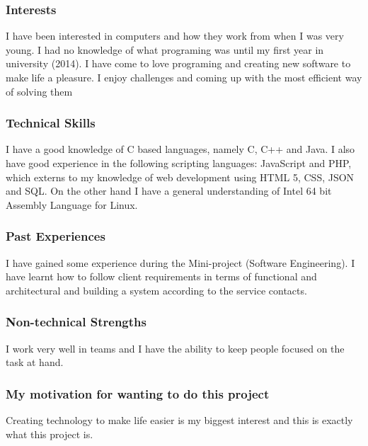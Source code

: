 \documentclass[a4paper,12pt]{article}
\begin{document}
		\subsubsection{Interests}
		I have been interested in computers and how they work from when I was very young. I had no knowledge of what programing was until my first year in university (2014). I have come to love programing and creating new software to make life a pleasure. I enjoy challenges and coming up with the most efficient way of solving them
		
		\subsubsection{Technical Skills}
		I have a good knowledge of C based languages, namely C, C++ and Java. I also have good experience in the following scripting languages: JavaScript and PHP, which externs to my knowledge of web development using HTML 5, CSS, JSON and SQL. On the other hand I have a general understanding of Intel 64 bit Assembly Language for Linux.
		
		\subsubsection{Past Experiences}
		I have gained some experience during the Mini-project (Software Engineering). I have learnt how to follow client requirements in terms of functional and architectural and building a system according to the service contacts. 
		
		\subsubsection{Non-technical Strengths}
		I work very well in teams and I have the ability to keep people focused on the task at hand.
		
		\subsubsection{My motivation for wanting to do this project}
		Creating technology to make life easier is my biggest interest and this is exactly what this project is. 
		
		\newpage
\end{document}
